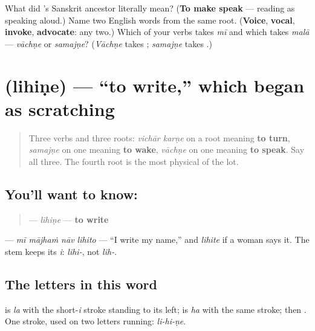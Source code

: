 \begin{tcolorbox}[breakable,colback=teal!4,colframe=teal!35!black,title={Before you move on}]
What did \textbf{}'s Sanskrit ancestor literally mean? (\textbf{To make speak} — reading as speaking aloud.) Name two English words from the same root. (\textbf{Voice}, \textbf{vocal}, \textbf{invoke}, \textbf{advocate}: any two.) Which of your verbs takes \emph{mī} and which takes \emph{malā} — \emph{vāchṇe} or \emph{samajṇe}? (\emph{Vāchṇe} takes \textbf{}; \emph{samajṇe} takes \textbf{}.)
\end{tcolorbox}
\section[\texorpdfstring{\mr{लिहिणे} (lihiṇe)}{लिहिणे (lihiṇe)}]{ (lihiṇe) — \textquotedblleft{}to write,\textquotedblright{} which began as scratching}

\label{lesson:MR-C08-lihine}



\begin{quote}
Three verbs and three roots: \emph{vichār karṇe} on a root meaning \textbf{to turn}, \emph{samajṇe} on one meaning \textbf{to wake}, \emph{vāchṇe} on one meaning \textbf{to speak}. Say all three. The fourth root is the most physical of the lot.
\end{quote}

\subsection*{You'll want to know: }
\begin{quote}
\textbf{} — \emph{lihiṇe} — \textbf{to write}
\end{quote}

\textbf{   } — \emph{mī mājhaṁ nāv lihito} — \textquotedblleft{}I write my name,\textquotedblright{} and \textbf{} \emph{lihite} if a woman says it. The stem keeps its \emph{i}: \emph{lihi-}, not \emph{lih-}.

\subsection*{The letters in this word}
\textbf{} is \textbf{} \emph{la} with the short-\emph{i} stroke standing to its left; \textbf{} is \textbf{} \emph{ha} with the same stroke; then \textbf{}. One stroke, used on two letters running: \emph{li-hi-ṇe}.


